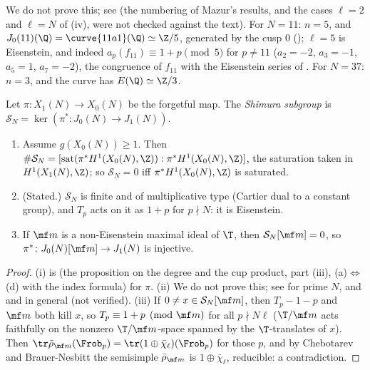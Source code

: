We do not prove this; see \cite[Chapter II]{Mazur77} (the numbering of Mazur's results, and the cases $\ell=2$ and $\ell=N$ of (iv), were not checked against the text). For $N=11$: $n=5$, and
$J_0(11)(\Q)=\curve{11a1}(\Q)\simeq\Z/5$, generated by the cusp $0$ (); $\ell=5$ is Eisenstein, and indeed $a_p(f_{11})\equiv1+p\pmod5$ for $p\ne11$ ($a_2=-2$, $a_3=-1$, $a_5=1$,
$a_7=-2$), the congruence of $f_{11}$ with the Eisenstein series of . For $N=37$: $n=3$, and the curve  has $E(\Q)\simeq\Z/3$.

\begin{definition}\label{def:moddeg:shimura-subgroup}
Let $\pi\colon X_1(N)\to X_0(N)$ be the forgetful map. The \emph{Shimura subgroup} is $\mathcal S_N=\ker(\pi^*\colon J_0(N)\to J_1(N))$.
\end{definition}

\begin{proposition}\label{prop:moddeg:shimura-subgroup}
\leavevmode
\begin{enumerate}[label=(\roman*)]
\item Assume $g(X_0(N))\ge1$. Then $\#\mathcal S_N=[\operatorname{sat}(\pi^*H^1(X_0(N),\Z)):\pi^*H^1(X_0(N),\Z)]$, the saturation taken in $H^1(X_1(N),\Z)$; so $\mathcal S_N=0$ iff
$\pi^*H^1(X_0(N),\Z)$ is saturated.
\item (Stated.) $\mathcal S_N$ is finite and of multiplicative type (Cartier dual to a constant group), and $T_p$ acts on it as $1+p$ for $p\nmid N$: it is Eisenstein.
\item If $\mf m$ is a non-Eisenstein maximal ideal of $\T$, then $\mathcal S_N[\mf m]=0$, so $\pi^*\colon J_0(N)[\mf m]\to J_1(N)$ is injective.
\end{enumerate}
\end{proposition}

\begin{proof}
(i) is  (the proposition on the degree and the cup product, part (iii), (a)$\Leftrightarrow$(d) with the index formula) for $\pi$. (ii) We do not prove this; see \cite[Chapter II]{Mazur77}
for prime $N$, and \cite{LingOesterle} and \cite{Ribet88} in general (not verified). (iii) If $0\ne x\in\mathcal S_N[\mf m]$, then $T_p-1-p$ and $\mf m$ both kill $x$, so $T_p\equiv1+p\pmod{\mf m}$ for all $p\nmid N\ell$
($\T/\mf m$ acts faithfully on the nonzero $\T/\mf m$-space spanned by the $\T$-translates of $x$). Then $\tr\bar\rho_{\mf m}(\Frob_p)=\tr(1\oplus\bar\chi_\ell)(\Frob_p)$ for those $p$, and by Chebotarev and
Brauer-Nesbitt the semisimple $\bar\rho_{\mf m}$ is $1\oplus\bar\chi_\ell$, reducible: a contradiction.
\end{proof}

